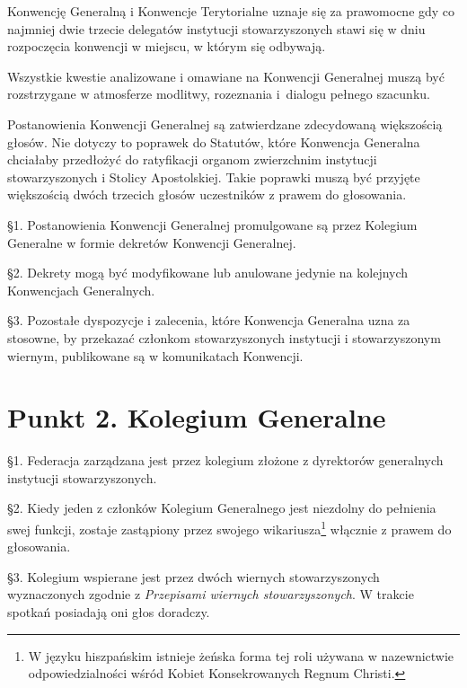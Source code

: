 

 Konwencję Generalną i Konwencje Terytorialne uznaje się za prawomocne gdy co najmniej dwie trzecie delegatów instytucji stowarzyszonych stawi się w dniu rozpoczęcia konwencji w miejscu, w którym się odbywają. 
 


 Wszystkie kwestie analizowane i omawiane na Konwencji Generalnej muszą być rozstrzygane w atmosferze modlitwy, rozeznania \mbox{i dialogu} pełnego szacunku.
 


 Postanowienia Konwencji Generalnej są zatwierdzane zdecydowaną większością głosów. Nie dotyczy to poprawek do Statutów, które Konwencja Generalna chciałaby przedłożyć do ratyfikacji organom zwierzchnim instytucji stowarzyszonych i Stolicy Apostolskiej. Takie poprawki muszą być przyjęte większością dwóch trzecich głosów uczestników z prawem do głosowania.
 


 \S{}1. Postanowienia Konwencji Generalnej promulgowane są przez Kolegium Generalne w formie dekretów Konwencji Generalnej.


\S{}2. Dekrety mogą być modyfikowane lub anulowane jedynie na kolejnych Konwencjach Generalnych.


\S{}3. Pozostałe dyspozycje i zalecenia, które Konwencja Generalna uzna za stosowne, by przekazać członkom stowarzyszonych instytucji i stowarzyszonym wiernym, publikowane są w komunikatach Konwencji.
 
\section{Punkt 2. Kolegium Generalne}
 


 \S{}1. Federacja zarządzana jest przez kolegium złożone z dyrektorów generalnych instytucji stowarzyszonych.


\S{}2. Kiedy jeden z członków Kolegium Generalnego jest niezdolny do pełnienia swej funkcji, zostaje zastąpiony przez swojego wikariusza\footnote{W języku hiszpańskim istnieje żeńska forma tej roli używana w nazewnictwie odpowiedzialności wśród Kobiet Konsekrowanych Regnum  Christi.} włącznie z prawem do głosowania.


\S{}3. Kolegium wspierane jest przez dwóch wiernych stowarzyszonych wyznaczonych zgodnie z {\em Przepisami wiernych stowarzyszonych}. W trakcie spotkań posiadają oni głos doradczy.
 
